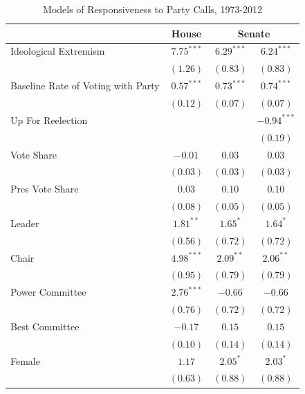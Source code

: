 \documentclass[12pt]{article}
\begin{document}
\begin{table}[!htbp]
\centering
\begin{threeparttable}
\caption{Models of Responsiveness to Party Calls, 1973-2012}
\label{tab-responsiveness-regressions}
\singlespacing
\begin{tabular}{l c c c }
\hline
& House & \multicolumn{2}{c}{Senate} \\
\hline

Ideological Extremism & $7.75^{***}$ & $6.29^{***}$ & $6.24^{***}$  \\
                      & $(1.26)$     & $(0.83)$     & $(0.83)$      \\
Baseline Rate of Voting with Party&$0.57^{***}$&$0.73^{***}$&$0.74^{***}$\\
                      & $(0.12)$     & $(0.07)$     & $(0.07)$      \\
Up For Reelection     &              &              & $-0.94^{***}$ \\
                      &              &              & $(0.19)$      \\
Vote Share            & $-0.01$      & $0.03$       & $0.03$        \\
                      & $(0.03)$     & $(0.03)$     & $(0.03)$      \\
Pres Vote Share       & $0.03$       & $0.10$       & $0.10$        \\
                      & $(0.08)$     & $(0.05)$     & $(0.05)$      \\
Leader                & $1.81^{**}$  & $1.65^{*}$   & $1.64^{*}$    \\
                      & $(0.56)$     & $(0.72)$     & $(0.72)$      \\
Chair                 & $4.98^{***}$ & $2.09^{**}$  & $2.06^{**}$   \\
                      & $(0.95)$     & $(0.79)$     & $(0.79)$      \\
Power Committee       & $2.76^{***}$ & $-0.66$      & $-0.66$       \\
                      & $(0.76)$     & $(0.72)$     & $(0.72)$      \\
Best Committee        & $-0.17$      & $0.15$       & $0.15$        \\
                      & $(0.10)$     & $(0.14)$     & $(0.14)$      \\
Female                & $1.17$       & $2.05^{*}$   & $2.03^{*}$    \\
                      & $(0.63)$     & $(0.88)$     & $(0.88)$      \\

\end{tabular}
\end{threeparttable}
\end{table}
\end{document}
